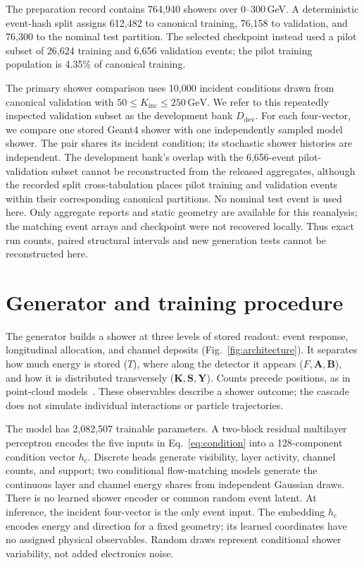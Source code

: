\documentclass[11pt]{article}
\newcommand{\GeV}{\,\mathrm{GeV}}
\newcommand{\Kinc}{K_{\mathrm{inc}}}
\newcommand{\Ddev}{D_{\mathrm{dev}}}
\begin{document}
The preparation record contains 764,940 showers over 0--300\,GeV. A deterministic event-hash split assigns 612,482 to canonical training, 76,158 to validation, and 76,300 to the nominal test partition. The selected checkpoint instead used a pilot subset of 26,624 training and 6,656 validation events; the pilot training population is 4.35\% of canonical training.

The primary shower comparison uses 10,000 incident conditions drawn from canonical validation with $50\leq\Kinc\leq250\GeV$. We refer to this repeatedly inspected validation subset as the development bank $\Ddev$. For each four-vector, we compare one stored Geant4 shower with one independently sampled model shower. The pair shares its incident condition; its stochastic shower histories are independent. The development bank's overlap with the 6,656-event pilot-validation subset cannot be reconstructed from the released aggregates, although the recorded split cross-tabulation places pilot training and validation events within their corresponding canonical partitions. No nominal test event is used here. Only aggregate reports and static geometry are available for this reanalysis; the matching event arrays and checkpoint were not recovered locally. Thus exact run counts, paired structural intervals and new generation tests cannot be reconstructed here.

\section{Generator and training procedure}
\label{sec:model}

The generator builds a shower at three levels of stored readout: event response, longitudinal allocation, and channel deposits (Fig.~\ref{fig:architecture}). It separates how much energy is stored ($T$), where along the detector it appears ($F,\mathbf A,\mathbf B$), and how it is distributed transversely ($\mathbf K,\mathbf S,\mathbf Y$). Counts precede positions, as in point-cloud models~\cite{caloclouds2,calopointflow}. These observables describe a shower outcome; the cascade does not simulate individual interactions or particle trajectories.

The model has 2,082,507 trainable parameters. A two-block residual multilayer perceptron encodes the five inputs in Eq.~\eqref{eq:condition} into a 128-component condition vector $h_c$. Discrete heads generate visibility, layer activity, channel counts, and support; two conditional flow-matching models generate the continuous layer and channel energy shares from independent Gaussian draws. There is no learned shower encoder or common random event latent. At inference, the incident four-vector is the only event input. The embedding $h_c$ encodes energy and direction for a fixed geometry; its learned coordinates have no assigned physical observables. Random draws represent conditional shower variability, not added electronics noise.
\end{document}
